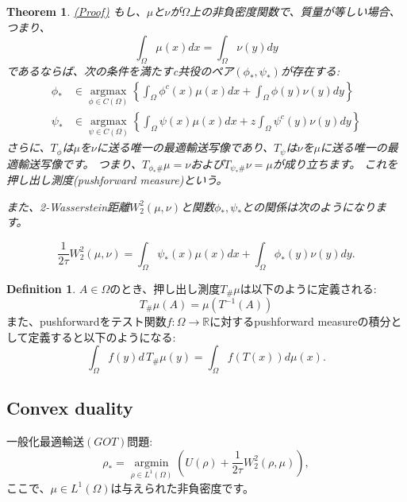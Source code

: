 \documentclass{jsarticle}
\newtheorem{thm}{Theorem}[section]
\theoremstyle{definition}
\newtheorem{dfn}{Definition}[section]
\begin{document}
{\color{teal}
\begin{thm}
    \label{thm:pushforward measure}
    \hyperlink{proof:thm:pushforward measure}{(Proof)}
    もし、$\mu$と$\nu$が$\Omega$上の非負密度関数で、質量が等しい場合、つまり、
    \[
        \int_{\Omega} \mu(x)dx = \int_{\Omega} \nu(y)dy
    \]
    であるならば、次の条件を満たすc共役のペア$(\phi_*, \psi_*)$が存在する:
    \begin{align*}
        \phi_* &\in \underset{\phi \in C(\Omega)} {\operatorname{argmax}}\left\{\int_{\Omega} \phi^c(x) \mu(x)dx + \int_{\Omega} \phi(y) \nu(y)dy \right\} \\
        \psi_* &\in \underset{\psi \in C(\Omega)} {\operatorname{argmax}} \left\{\int_{\Omega} \psi(x) \mu(x)dx +z \int_{\Omega} \psi^c(y) \nu(y)dy \right\}
    \end{align*}
さらに、$T_\phi$は$\mu$を$\nu$に送る唯一の最適輸送写像であり、$T_\psi$は$\nu$を$\mu$に送る唯一の最適輸送写像です。
つまり、$T_{\phi_* \#} \mu = \nu$および$T_{\psi_* \#} \nu = \mu$が成り立ちます。
これを押し出し測度(pushforward measure)という。

また、2-Wasserstein距離$W^2_2(\mu, \nu)$と関数$\phi_*, \psi_*$との関係は次のようになります。

\[
\frac{1}{2\tau}W^2_2(\mu, \nu) = \int_{\Omega} \psi_*(x) \mu(x)dx + \int_{\Omega} \phi_*(y) \nu(y)dy.
\]
\end{thm}
}

\begin{dfn}
    $A \in \Omega$のとき、押し出し測度$T_{\#} \mu$は以下のように定義される:
    \[
      T_\# \mu (A) = \mu (T^{-1}(A))  
    \]
    また、pushforwardをテスト関数$f: \Omega \to \mathbb{R}$に対するpushforward measureの積分として定義すると以下のようになる:
    \begin{equation}
        \label{def:pushforward_int}
        \int_{\Omega} f(y)d\, T_\# \mu (y) = \int_\Omega f(T(x)) d \mu(x).
      \end{equation}
\end{dfn}

\subsection{Convex duality}
\label{sect:Convex duality}
一般化最適輸送$(GOT)$問題:
\begin{equation}
    \label{eq: GOT}
        \rho_* = \underset{\rho \in L^1(\Omega)} {\operatorname{argmin}} \left( U(\rho) + \frac{1}{2 \tau}W_2^2(\rho, \mu) \right), 
\end{equation}
ここで、$\mu \in L^1(\Omega)$は与えられた非負密度です。
\end{document}
